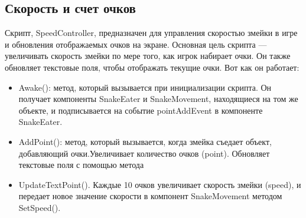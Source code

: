 \subsection{Скорость и счет очков}
Скрипт, SpeedController, предназначен для управления скоростью змейки в игре и обновления отображаемых очков на экране. Основная цель скрипта — увеличивать скорость змейки по мере того, как игрок набирает очки. Он также обновляет текстовые поля, чтобы отображать текущие очки.
Вот как он работает:
\begin{itemize}
    \item Awake(): метод, который вызывается при инициализации скрипта. Он получает компоненты SnakeEater и SnakeMovement, находящиеся на том же объекте, и подписывается на событие pointAddEvent в компоненте SnakeEater.
    \item AddPoint(): метод, который вызывается, когда змейка съедает объект, добавляющий очки.Увеличивает количество очков (point). Обновляет текстовые поля с помощью метода 
    \item UpdateTextPoint(). Каждые 10 очков увеличивает скорость змейки (speed), и передает новое значение скорости в компонент SnakeMovement методом SetSpeed().
\end{itemize}
